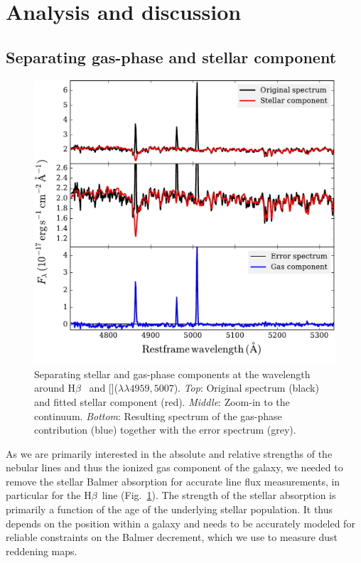 \documentclass[traditabstract]{aa}
\newcommand{\hb}{H$\beta$}
\newcommand{\oiii}{[\ion{O}{iii}]}
\begin{document}
\section{Analysis and discussion}

\subsection{Separating gas-phase and stellar component}
\label{sec:stargas}

\begin{figure}
\includegraphics[angle=0, width=0.99\columnwidth]{Figs/Stargas_spec.pdf}
\caption{Separating stellar and gas-phase components at the {wavelength around \hb~ and \oiii($\lambda\lambda4959,5007$). \textit{Top}: Original spectrum (black) and  fitted stellar component (red). \textit{Middle}: Zoom-in to the continuum. \textit{Bottom}: Resulting spectrum of the gas-phase contribution (blue) together with the error spectrum (grey).}}
\label{fig:stargas}
\end{figure}

As we are primarily interested in the absolute and relative strengths of the nebular lines and thus the ionized gas component of the galaxy, we needed to remove the stellar Balmer absorption for accurate line flux measurements, in particular for the \hb~line (Fig.~\ref{fig:stargas}). The strength of the stellar absorption is primarily a function of the age of the underlying stellar population. It thus depends on the position within a galaxy and needs to be accurately modeled for reliable constraints on the Balmer decrement, which we use to measure dust reddening maps.
\end{document}
